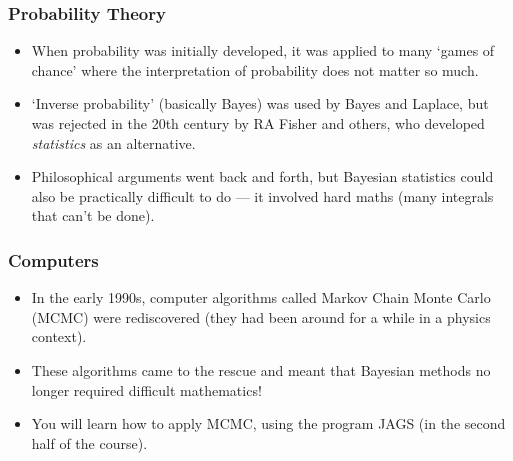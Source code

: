 \documentclass{beamer}
\begin{document}
\begin{frame}
\frametitle{Probability Theory}
\begin{itemize}
\item When probability was initially developed, it was applied to many `games of chance' where the interpretation of probability does not matter so much.\pause

\item `Inverse probability' (basically Bayes) was used by Bayes and
Laplace, but was rejected in the 20th century by RA Fisher and
others, who developed {\em statistics} as an alternative.\pause

\item Philosophical arguments went back and forth,
but Bayesian statistics could also be practically difficult to do
--- it involved hard maths (many integrals that can't be done).
\end{itemize}


\end{frame}


\begin{frame}
\frametitle{Computers}
\begin{itemize}
\item In the early 1990s, computer algorithms called Markov Chain
Monte Carlo (MCMC) were rediscovered (they had been around for
a while in a physics context).\\[0.5em] \pause

\item These algorithms came to the rescue and meant that Bayesian
methods no longer required difficult mathematics!\\[0.5em] \pause

\item You will learn how to apply MCMC, using the program
JAGS (in the second half of the course).
\end{itemize}


\end{frame}
\end{document}
